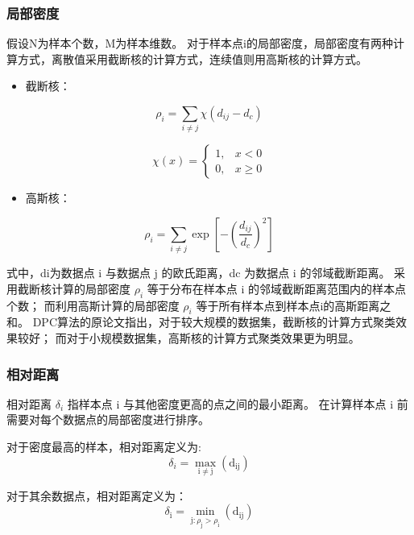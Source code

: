 \documentclass[UTF8,a4paper,AutoFakeBold,AutoFakeSlant]{article}
\begin{document}
\subsubsection{局部密度}

假设N为样本个数，M为样本维数。
对于样本点i的局部密度，局部密度有两种计算方式，离散值采用截断核的计算方式，连续值则用高斯核的计算方式。

\begin{itemize}
  \item 截断核：
\end{itemize}

\begin{equation*}
  \rho_{i}=\sum_{i \neq j} \chi\left(d_{i j}-d_{c}\right)
\end{equation*}

\begin{equation*}
  \chi(x)=\left\{\begin{array}{ll}
    1, & x<0 \\
    0, & x \geq 0
    \end{array}\right.
\end{equation*}

\begin{itemize}
  \item 高斯核：
\end{itemize}

\begin{equation*}
  \rho_{i}=\sum_{i \neq j} \exp \left[-\left(\frac{d_{i j}}{d_{c}}\right)^{2}\right]
\end{equation*}

式中，di为数据点 i 与数据点 j 的欧氏距离，dc 为数据点 i 的邻域截断距离。
采用截断核计算的局部密度 $\rho_i$ 等于分布在样本点 i 的邻域截断距离范围内的样本点个数；
而利用高斯计算的局部密度 $\rho_i$ 等于所有样本点到样本点i的高斯距离之和。
DPC算法的原论文指出，对于较大规模的数据集，截断核的计算方式聚类效果较好；
而对于小规模数据集，高斯核的计算方式聚类效果更为明显。


\subsubsection{相对距离}

相对距离 $\delta_i$ 指样本点 i 与其他密度更高的点之间的最小距离。
在计算样本点 i 前需要对每个数据点的局部密度进行排序。

对于密度最高的样本，相对距离定义为:
$$ \delta_{i}=\max _{\mathrm{i} \neq \mathrm{j}}\left(\mathrm{d}_{\mathrm{ij}}\right) $$

对于其余数据点，相对距离定义为：
$$ \delta_{\mathrm{i}}=\min _{\mathrm{j}: \rho_{\mathrm{j}}>\rho_{\mathrm{i}}}\left(\mathrm{d}_{\mathrm{ij}}\right) $$
\end{document}
